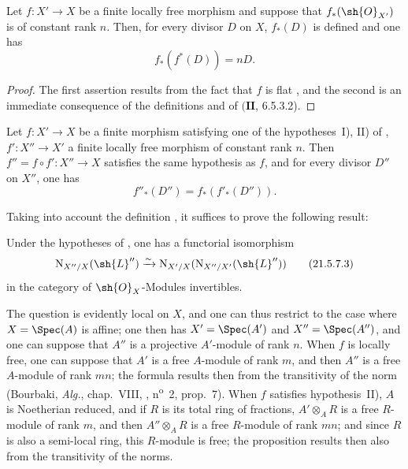 \begin{proposition}[21.5.6]
\label{IV.21.5.6}
Let $f:X'\to X$ be a finite locally free morphism and suppose that $f_*(\sh{O}_{X'})$ is of constant rank $n$.
Then, for every divisor $D$ on $X$, $f_*(D)$ is defined and one has
\[
\label{IV.21.5.6.1}
  f_*(f^*(D))=nD.
  \tag{21.5.6.1}
\]
\end{proposition}

\begin{proof}
The first assertion results from the fact that $f$ is flat , and the second is an immediate consequence of the definitions and of $(\mathbf{II}$, 6.5.3.2).
\end{proof}

\begin{proposition}[21.5.7]
\label{IV.21.5.7}
Let $f:X'\to X$ be a finite morphism satisfying one of the hypotheses~I), II) of , $f':X''\to X'$ a finite locally free morphism of constant rank $n$.
Then $f''=f\circ f':X''\to X$ satisfies the same hypothesis as $f$, and for every divisor $D''$ on $X''$, one has
\[
\label{IV.21.5.7.1}
  f''_*(D'')=f_*(f'_*(D'')).
  \tag{21.5.7.1}
\]
\end{proposition}

Taking into account the definition , it suffices to prove the following result:

\begin{lemma}[21.5.7.2]
\label{IV.21.5.7.2}
Under the hypotheses of , one has a functorial isomorphism
\[
\label{IV.21.5.7.3}
  \mathrm{N}_{X''/X}(\sh{L}'')\xrightarrow{\sim}\mathrm{N}_{X'/X}(\mathrm{N}_{X''/X'}(\sh{L}''))
  \tag{21.5.7.3}
\]
in the category of $\sh{O}_X$-Modules invertibles.
\end{lemma}

The question is evidently local on $X$, and one can thus restrict to the case where $X=\Spec(A)$ is affine; one then has $X'=\Spec(A')$ and $X''=\Spec(A'')$, and one can suppose that $A''$ is a projective $A'$-module of rank $n$.
When $f$ is locally free, one can suppose that $A'$ is a free $A$-module of rank $m$, and then $A''$ is a free $A$-module of rank $mn$;
the formula  results then from the transitivity of the norm (Bourbaki, \emph{Alg.}, chap.~VIII, , n\textsuperscript{o}~2, prop.~7).
When $f$ satisfies hypothesis~II), $A$ is Noetherian reduced, and if $R$ is its total ring of fractions, $A'\otimes_A R$ is a free $R$-module of rank $m$, and then $A''\otimes_A R$ is a free $R$-module of rank $mn$;
and since $R$ is also a semi-local ring, this $R$-module is free;
the proposition results then also from the transitivity of the norms.

